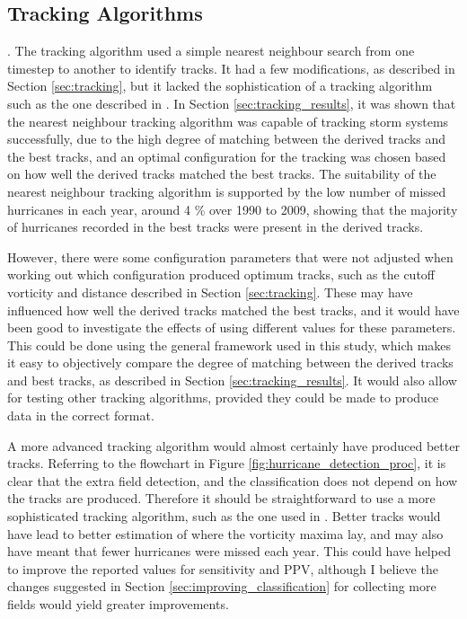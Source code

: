\documentclass[pdftex,12pt,a4paper]{report}
\begin{document}
\subsection{Tracking Algorithms}
\label{sec:discussion_tracking_algs}.
The tracking algorithm used a simple nearest neighbour search from one timestep to another to
identify tracks. It had a few modifications, as described in Section \ref{sec:tracking}, but it
lacked the sophistication of a tracking algorithm such as the one described in
\textcite{hodges1994general, hodges1999adaptive}. In Section \ref{sec:tracking_results}, it was
shown that the nearest neighbour tracking algorithm was capable of tracking storm systems
successfully, due to the high degree of matching between the derived tracks and the best tracks, and an
optimal configuration for the tracking was chosen based on how well the derived tracks matched the
best tracks. The suitability of the nearest neighbour tracking algorithm is supported by the low
number of missed hurricanes in each year, around 4 \% over 1990 to 2009, showing that the majority
of hurricanes recorded in the best tracks were present in the derived tracks. 

However, there were some configuration parameters that were not adjusted when working out which
configuration produced optimum tracks, such as the cutoff vorticity and distance described in Section
\ref{sec:tracking}. These may have influenced how well the derived tracks matched the best tracks,
and it would have been good to investigate the effects of using different values for these
parameters. This could be done using the general framework used in this study, which makes it easy
to objectively compare the degree of matching between the derived tracks and best tracks, as
described in Section \ref{sec:tracking_results}. It would also allow for testing other tracking
algorithms, provided they could be made to produce data in the correct format. 


A more advanced tracking algorithm would almost certainly have produced better tracks. Referring to
the flowchart in Figure \ref{fig:hurricane_detection_proc}, it is clear that the extra field
detection, and the classification does not depend on how the tracks are produced. Therefore it
should be straightforward to use a more sophisticated tracking algorithm, such as the one used in
\textcite{thorncroft2001african}. Better tracks would have lead to better estimation of where the
vorticity maxima lay, and may also have meant that fewer hurricanes were missed each year. This
could have helped to improve the reported values for sensitivity and PPV, although I believe the
changes suggested in Section \ref{sec:improving_classification} for collecting more fields
would yield greater improvements.
\end{document}
